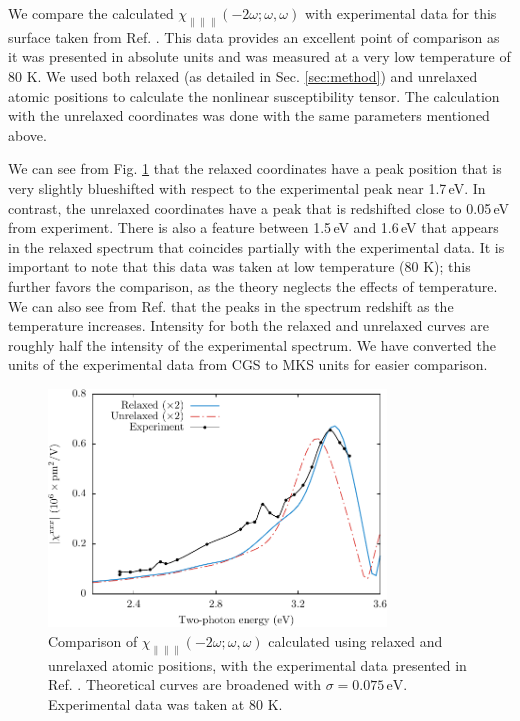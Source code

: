 \documentclass[11pt]{book}
\begin{document}
We compare the calculated $\chi_{\parallel\parallel\parallel}(-2\omega;\omega,\omega)$ with experimental data for this surface taken from Ref. \cite{hoferAPA96}. This data provides an excellent point of comparison as it was presented in absolute units and was measured at a very low temperature of 80 K. We used both relaxed (as detailed in Sec. \ref{sec:method}) and unrelaxed atomic positions to calculate the nonlinear susceptibility tensor. The calculation with the unrelaxed coordinates was done with the same parameters mentioned above.

We can see from Fig. \ref{fig:Xxxx} that the relaxed coordinates have a peak position that is very slightly blueshifted with respect to the experimental peak near 1.7\,eV. In contrast, the unrelaxed coordinates have a peak that is redshifted close to 0.05\,eV from experiment. There is also a feature between 1.5\,eV and 1.6\,eV that appears in the relaxed spectrum that coincides partially with the experimental data. It is important to note that this data was taken at low temperature (80 K); this further favors the comparison, as the theory neglects the effects of temperature. We can also see from Ref. \cite{hoferAPA96} that the peaks in the spectrum redshift as the temperature increases. Intensity for both the relaxed and unrelaxed curves are roughly half the intensity of the experimental spectrum. We have converted the units of the experimental data from CGS to MKS units for easier comparison.

\begin{figure}
\centering
\includegraphics[width=0.8\textwidth]{../figures/04-results/fig-4_3_01}
\caption{Comparison of
$\chi_{\parallel\parallel\parallel}(-2\omega;\omega,\omega)$ calculated using
relaxed and unrelaxed atomic positions, with the experimental data presented in
Ref. \cite{hoferAPA96}. Theoretical curves are broadened with
$\sigma=0.075\,\text{eV}$. Experimental data was taken at 80 K.}
\label{fig:Xxxx}
\end{figure}
\end{document}
